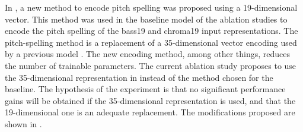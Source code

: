 
In , a new method to encode
pitch spelling was proposed using a 19-dimensional vector.
This method was used in the baseline model of the ablation
studies to encode the pitch spelling of the \gls{bass19} and
\gls{chroma19} input representations. The pitch-spelling
method is a replacement of a 35-dimensional vector encoding
used by a previous model \parencite{micchi2021deep}. The new
encoding method, among other things, reduces the number of
trainable parameters. The current ablation study proposes to
use the 35-dimensional representation in
\textcite{micchi2021deep} instead of the method chosen for
the baseline. The hypothesis of the experiment is that no
significant performance gains will be obtained if the
35-dimensional representation is used, and that the
19-dimensional one is an adequate replacement. The
modifications proposed are shown in .

